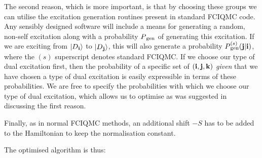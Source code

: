 \documentclass{article}
\newcommand{\ket}[1]{|#1\rangle}
\newcommand{\D}[1]{D\/_{\bf #1 } }
\newcommand{\Pgji}[2]{
P\/_{\text{gen}}^{(s)}({\bf #1}|{\bf #2})
}
\begin{document}
The second reason, which is more important, is that by choosing these groups we can utilise the excitation generation routines present in standard FCIQMC code. Any sensibly designed software will include a means for generating a random, non-self excitation along with a probability $P\/_{\text{gen}}$ of generating this excitation. If we are exciting from $\ket{\D{i}}$ to $\ket{\D{j}}$, this will also generate a probability $\Pgji{j}{i}$, where the $(s)$ superscript denotes standard FCIQMC. If we choose our type of dual excitation first, then the probability of a specific set of $({\bf i},{\bf j},{\bf k})$ {\em given\/} that we have chosen a type of dual excitation is easily expressible in terms of these probabilities.
We are free to specify the probabilities with which we choose our type of dual excitation, which allows us to optimise as was suggested in discussing the first reason.

Finally, as in normal FCIQMC methods, an additional shift $-S$ has to be added to the Hamiltonian to keep the normalisation constant.

The optimised algorithm is thus:

\hspace{10pt}
\end{document}

